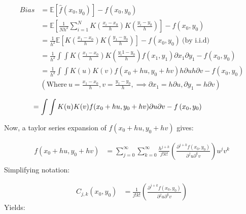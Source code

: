 \documentclass[11pt]{article}
\theoremstyle{definition}
\begin{document}
\begin{equation*}
\begin{split}
Bias & =\mathbb{E}\left[\hat{f}(x_0, y_0)\right]-f\left(x_0, y_0\right) \\
 & =\mathbb{E}\left[\frac{1}{Nh^{2}} \sum_{i=1}^{N} K\left(\frac{x_i - x_{0}}{h}\right) K\left(\frac{y_i - y_{0}}{h}\right)\right]-f\left(x_0, y_0\right) \\
 & =\frac{1}{h^{2}}\mathbb{E}\left[K\left(\frac{x_1 - x_{0}}{h}\right) K\left(\frac{y_1 - y_{0}}{h}\right)\right]-f\left(x_0, y_0\right) \ \text{(by i.i.d)} \\
 & = \frac{1}{h^{2}}\int\int K\left(\frac{x_1 - x_{0}}{h}\right) K\left(\frac{y_i1- y_{0}}{h}\right)f(x_{1},y_{1})\partial{x_{1}}\partial{y_{1}}-f\left(x_0, y_0\right) \\
 & = \frac{1}{h^{2}}\int\int K(u) K(v)f(x_{0}+hu,y_{0}+hv)h\partial{u}h\partial{v}-f\left(x_0, y_0\right)  \\
 & \left(\text{Where} \ u=\frac{x_{1}-x_{0}}{h}, v=\frac{y_{1}-y_{0}}{h}, \implies \partial{x_{1}}=h\partial{u}, \partial{y_{1}}=h\partial{v} \right) \\
 \end{split}
\end{equation*}
\begin{equation}
\begin{split}
 & = \int\int K(u) K(v)f(x_{0}+hu,y_{0}+hv)\partial{u}\partial{v}-f\left(x_0, y_0\right)  \hspace{15mm}\\ 
\end{split}
\end{equation}

\noindent
Now, a taylor series expansion of $f(x_{0}+hu,y_{0}+hv)$ gives:

\begin{equation*}
\begin{split}
f(x_{0}+hu,y_{0}+hv) &= \sum_{j=0}^{\infty} \sum_{k=0}^{\infty} \frac{h^{j+k}}{j!k!}\left(\frac{\partial^{j+k}{f}(x_{0},y_{0})}{\partial^{j}u\partial^{k}v}\right)u^{j}v^{k} \\
\end{split}
\end{equation*}
Simplifying notation:

\begin{equation*}
\begin{split}
C_{j,k}\left(x_{0},y_{0}\right) & = \frac{1}{j!k!}\left(\frac{\partial^{j+k}{f}(x_{0},y_{0})}{\partial^{j}u\partial^{k}v}\right)
\end{split}
\end{equation*}
Yields:
\end{document}
